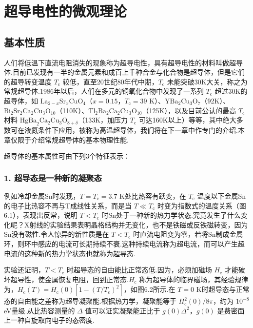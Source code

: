 \chapter{超导电性的微观理论}

\section{基本性质}

人们将低温下直流电阻消失的现象称为超导电性，具有超导电性的材料叫做超导体.目前已发现有一半的金属元素和成百上千种合金与化合物是超导体，但是它们的超导转变温度 $T_{\mathrm{c}}$ 较低，直至20世纪80年代中期，$T_{\mathrm{c}}$ 未能突破30K大关，称之为常规超导体.1986年以后，人们在多元的铜氧化合物中发现了一系列 $T_{\mathrm{c}}$ 超过30K的超导体，如 $\mathrm{La}_{2-x}\mathrm{Sr}_{x}\mathrm{CuO}_{4}$（$x=0.15$，$T_{\mathrm{c}}=39$ K）、$\mathrm{YBa}_{2}\mathrm{Cu}_{3}\mathrm{O}_{7}$（92K）、$\mathrm{Bi}_{2}\mathrm{Sr}_{2}\mathrm{Ca}_{2}\mathrm{Cu}_{3}\mathrm{O}_{10}$（110K）、$\mathrm{Tl}_{2}\mathrm{Ba}_{2}\mathrm{Ca}_{2}\mathrm{Cu}_{3}\mathrm{O}_{10}$（125K），以及目前公认的最高 $T_{\mathrm{c}}$ 材料 $\mathrm{HgBa}_{2}\mathrm{Ca}_{2}\mathrm{Cu}_{3}\mathrm{O}_{8+\delta}$（133K，加压力 $T_{\mathrm{c}}$ 可达160K以上）等等，其中绝大多数可在液氮条件下应用，被称为高温超导体，我们将在下一章中作专门的介绍.本章仅限于介绍常规超导体的基本物理性能.

超导体的基本属性可由下列3个特征表示：

\subsection*{1. 超导态是一种新的凝聚态}

例如冷却金属Sn时发现，$T=T_{\mathrm{c}}=3.7$ K处比热容有跃变，在 $T_{\mathrm{c}}$ 温度以下金属Sn的电子比热容不再与T成线性关系，而是当 $T\ll T_{\mathrm{c}}$ 时变为指数式的温度关系（图6.1），表现出反常，说明 $T<T_{\mathrm{c}}$ 时Sn处于一种新的热力学状态.究竟发生了什么变化呢？X射线的实验结果表明晶格结构并无变化，也不是铁磁或反铁磁转变，因为Sn没有磁性.令人惊异的新性质是在 $T<T_{\mathrm{c}}$ 时直流电阻变为零，若将Sn制成金属环，则环中感应的电流可长期持续不衰.这种持续电流称为超电流，而可以产生超电流的这种新的热力学状态也就称为超导态.

实验还证明，$T<T_{\mathrm{c}}$ 时超导态的自由能比正常态低.因为，必须加磁场 $H_{\mathrm{c}}$ 才能破坏超导性，使金属恢复电阻，回到正常态.$H_{\mathrm{c}}$ 称为超导体的临界磁场，其经验规律为，$H_{\mathrm{c}}(T)=H_{\mathrm{c}}(0)\left[1-(T/T_{\mathrm{c}})^{2}\right]$，如图6.2所示.在 $T=0$ K时超导态与正常态的自由能之差称为超导凝聚能.根据热力学，凝聚能等于 $H_{\mathrm{c}}^{2}(0)/8\pi$，约为 $10^{-8}$ eV量级.从比热容测量的 $\Delta$ 值可以证实凝聚能正比于 $g(0)\Delta^{2}$，$g(0)$ 是费密面上一种自旋取向电子的态密度.

